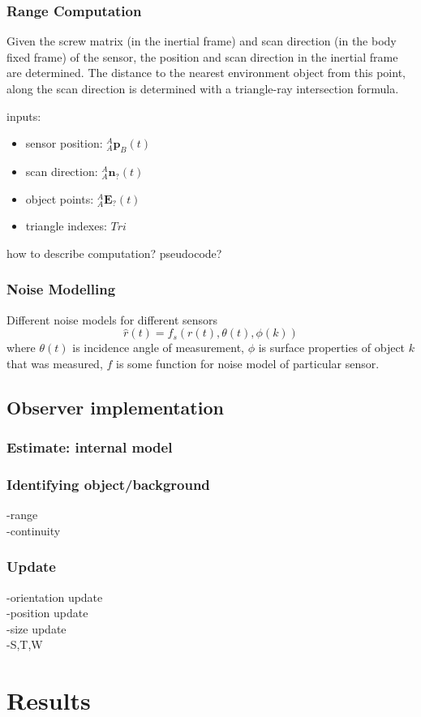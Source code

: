 	\subsubsection{Range Computation}
	Given the screw matrix (in the inertial frame) and scan direction (in the body fixed frame) of the sensor, the position and scan direction in the inertial frame are determined.
	The distance to the nearest environment object from this point, along the scan direction is determined with a triangle-ray intersection formula.
	
	inputs:
	\begin{itemize}
	\item sensor position: ${^{A}_{A}\mathbf{p}^{}_{B}}(t)$
	\item scan direction: ${^{A}_{A}\mathbf{n}^{}_{?}}(t)$
	\item object points: ${^{A}_{A}\mathbf{E}^{}_{?}}(t)$
	\item triangle indexes:	$Tri$
	\end{itemize}
	
	how to describe computation? pseudocode?\\
	
	\subsubsection{Noise Modelling}
	Different noise models for different sensors
	\begin{equation}
		\hat{r}(t) = f_s(r(t),\theta(t),\phi(k))
	\end{equation}
	where $\theta(t)$ is incidence angle of measurement, $\phi$ is surface properties of object $k$ that was measured, $f$ is some function for noise model of particular sensor.
	
\subsection{Observer implementation}
	\subsubsection{Estimate: internal model}
	\subsubsection{Identifying object/background}
		-range\\
		-continuity\\
	\subsubsection{Update}
		-orientation update\\
		-position update\\
		-size update\\
		-S,T,W\\
\section{Results}